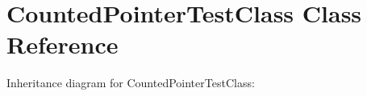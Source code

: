 \hypertarget{classCountedPointerTestClass}{}\section{Counted\+Pointer\+Test\+Class Class Reference}
\label{classCountedPointerTestClass}


Inheritance diagram for Counted\+Pointer\+Test\+Class\+:
